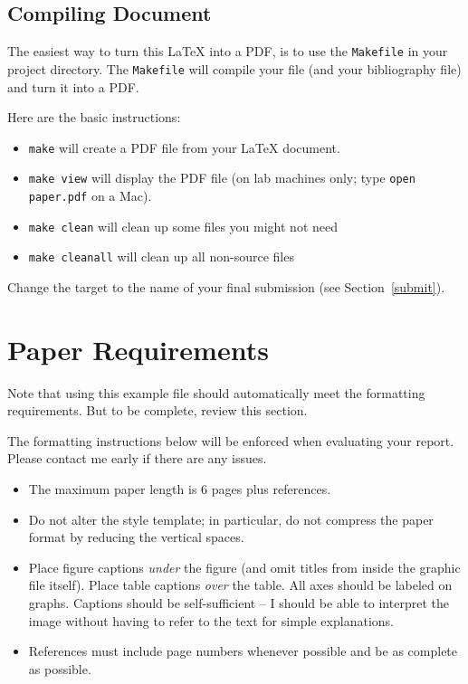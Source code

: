 \documentclass{article}
\begin{document}
\subsection{Compiling Document}
The easiest way to turn this \LaTeX{} into a PDF, is to use the
{\tt Makefile} in your project directory. The {\tt Makefile} will
compile your file (and your bibliography file) and turn it into a PDF.

Here are the basic instructions:
\begin{itemize}
\item {\tt make} will create a PDF file from your \LaTeX{} document.
\item {\tt make view} will display the PDF file (on lab machines only; type
  {\tt open paper.pdf} on a Mac).
\item {\tt make clean} will clean up some files you might not need
\item {\tt make cleanall} will clean up all non-source files
\end{itemize}

Change the target to the name of your final submission (see Section~\ref{submit}).

\section{Paper Requirements}
\label{requirements}
Note that using this example file should automatically meet the formatting
requirements.  But to be complete, review this section.

The formatting instructions below will be enforced when evaluating your
report.  Please contact me early if there are any issues.
\begin{itemize}
\item The maximum paper length is 6 pages plus references.
\item Do not alter the style template; in particular, do not compress the paper format
by reducing the vertical spaces.
\item Place figure captions {\em under} the figure (and omit titles from
  inside the graphic file itself).  Place table captions {\em over}
  the table. All axes should be labeled on graphs.  Captions
  should be self-sufficient -- I should be able to interpret the image without
  having to refer to the text for simple explanations.
\item References must include page numbers whenever possible and be as
  complete as possible.
\end{itemize}
\end{document}
